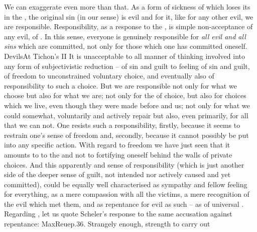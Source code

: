 We can exaggerate even more than that.  As a form of sickness of 
which loses its  in the , the original sin
(in our sense) is evil and for it, like for any other evil, we are responsible.
Responsibility, as a response to the , is simple non-acceptance of
any evil, of . In this sense, everyone is genuinely responsible
for {\em all evil and all sins} which are committed, not only for those which
one has committed oneself. \citet{Every man who sins, sins against all people and
  every man is to some degree guilty of another's sin.}{Devils}{At Tichon's
  II}
It is unacceptable 
to all manner of thinking involved into any form of
subjectivistic reduction -- of sin and guilt to feeling of sin and guilt, of
freedom to unconstrained voluntary choice, and eventually also of
responsibility to such a choice.
But we are responsible not only for what we choose but also for what we are; not
only for the  of choice, but also for choices which we live,
even though they were made
before and  us; not only for what we could somewhat, voluntarily and
actively repair but also, even primarily, for all that we can not.  One resists
such a responsibility, firstly, because it seems to restrain one's sense of
freedom and, secondly, because it cannot possibly be put into any specific
action. With regard to freedom we have just seen that it amounts to
 to the  and not to fortifying oneself behind the
walls of private choices. And this apparently  and
 sense of responsibility  (which is just
another side of the deeper sense of guilt, not intended nor actively caused and
yet committed), could be equally well characterised as sympathy and fellow
feeling for everything, as a mere compassion with all the victims, a mere
recognition of the evil which met them, and as repentance for evil as such -- 
as  of universal . Regarding
  , let us quote Scheler's response to the same accusation
against repentance: \citet{The jovial gentlemen say: Do not repent, but design
  good projects and do better in the future! But the jovial gentlemen do not say
 whence the strength for designing good projects and even more for their execution
 should be fetched, if no prior  liberation and self-empowerment of the person, 
 through repentance, against the determining power of the past takes
 place.}{MaxReue}{p.36.} Strangely enough, strength to carry out
